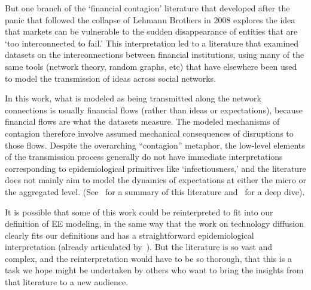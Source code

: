 
But one branch of the `financial contagion' literature that developed after the panic that followed the collapse of Lehmann Brothers in 2008 explores the idea that markets can be vulnerable to the sudden disappearance of entities that are `too interconnected to fail.' This interpretation led to a literature that examined datasets on the interconnections between financial institutions, using many of the same tools (network theory, random graphs, etc) that have elsewhere been used to model the transmission of ideas across social networks.

In this work, what is modeled as being transmitted along the network connections is usually financial flows (rather than ideas or expectations), because financial flows are what the datasets measure.  The modeled mechanisms of contagion therefore involve assumed mechanical consequences of disruptions to those flows.  Despite the overarching ``contagion'' metaphor, the low-level elements of the transmission process generally do not have immediate interpretations corresponding to epidemiological primitives like `infectiousness,' and the literature does not mainly aim to model the dynamics of expectations at either the micro or the aggregated level.  (See~\cite{glasserman2016contagion} for a summary of this literature and~\cite{cabrales2015financial} for a deep dive).

It is possible that some of this work could be reinterpreted to fit into our definition of EE modeling, in the same way that the work on technology diffusion clearly fits our definitions and has a straightforward epidemiological interpretation (already articulated by~\cite{arrow_classificatory_1969}).  But the literature is so vast and complex, and the reinterpretation would have to be so thorough, that this is a task we hope might be undertaken by others who want to bring the insights from that literature to a new audience.

